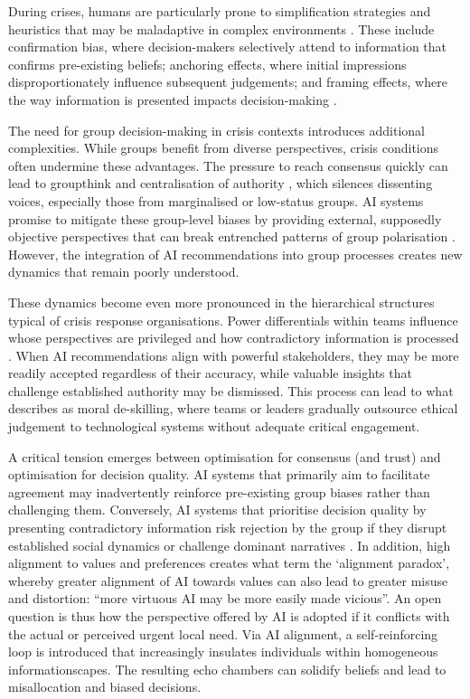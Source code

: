 \documentclass[pdflatex,sn-basic]{sn-jnl}
\begin{document}
During crises, humans are particularly prone to simplification strategies and heuristics that may be maladaptive in complex environments \citep{klein2010rapid}. These include confirmation bias, where decision-makers selectively attend to information that confirms pre-existing beliefs; anchoring effects, where initial impressions disproportionately influence subsequent judgements; and framing effects, where the way information is presented impacts decision-making \citep{paulus2022influence}.

The need for group decision-making in crisis contexts introduces additional complexities. While groups benefit from diverse perspectives, crisis conditions often undermine these advantages. The pressure to reach consensus quickly can lead to groupthink and centralisation of authority \citep{driskell1991group}, which silences dissenting voices, especially those from marginalised or low-status groups. AI systems promise to mitigate these group-level biases by providing external, supposedly objective perspectives that can break entrenched patterns of group polarisation \citep{jirovsky2021can}. However, the integration of AI recommendations into group processes creates new dynamics that remain poorly understood.

These dynamics become even more pronounced in the hierarchical structures typical of crisis response organisations. Power differentials within teams influence whose perspectives are privileged and how contradictory information is processed \citep{comes2024ai}. When AI recommendations align with powerful stakeholders, they may be more readily accepted regardless of their accuracy, while valuable insights that challenge established authority may be dismissed. This process can lead to what \citet{vallor2015moral} describes as moral de-skilling, where teams or leaders gradually outsource ethical judgement to technological systems without adequate critical engagement.

A critical tension emerges between optimisation for consensus (and trust) and optimisation for decision quality. AI systems that primarily aim to facilitate agreement may inadvertently reinforce pre-existing group biases rather than challenging them. Conversely, AI systems that prioritise decision quality by presenting contradictory information risk rejection by the group if they disrupt established social dynamics or challenge dominant narratives \citep{manzini2024should}. In addition, high alignment to values and preferences creates what \citet{west2025alignment} term the `alignment paradox', whereby greater alignment of AI towards values can also lead to greater misuse and distortion: ``more virtuous AI may be more easily made vicious''. An open question is thus how the perspective offered by AI is adopted if it conflicts with the actual or perceived urgent local need. Via AI alignment, a self-reinforcing loop is introduced that increasingly insulates individuals within homogeneous informationscapes. The resulting echo chambers can solidify beliefs and lead to misallocation and biased decisions.
\end{document}
